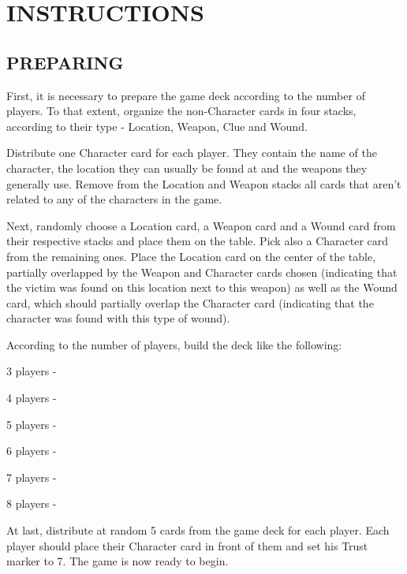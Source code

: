 \documentclass[a4paper, 11pt]{article}
\begin{document}
\section*{INSTRUCTIONS}

\vspace{5mm}


\subsection*{PREPARING}

	First, it is necessary to prepare the game deck according to the number of players. To that extent, organize the non-Character cards in four stacks, according to their type - Location, Weapon, Clue and Wound.

	Distribute one Character card for each player. They contain the name of the character, the location they can usually be found at and the weapons they generally use. Remove from the Location and Weapon stacks all cards that aren't related to any of the characters in the game.


	
	Next, randomly choose a Location card, a Weapon card and a Wound card from their respective stacks and place them on the table. Pick also a Character card from the remaining ones. Place the Location card on the center of the table, partially overlapped by the Weapon and Character cards chosen (indicating that the victim was found on this location next to this weapon) as well as the Wound card, which should partially overlap the Character card (indicating that the character was found with this type of wound). 

	According to the number of players, build the deck like the following:


	3 players - 

	4 players - 

	5 players - 

	6 players - 

	7 players  - 

	8 players - 

	At last, distribute at random 5 cards from the game deck for each player. Each player should place their Character card in front of them and set his Trust marker to 7. The game is now ready to begin.
\end{document}
